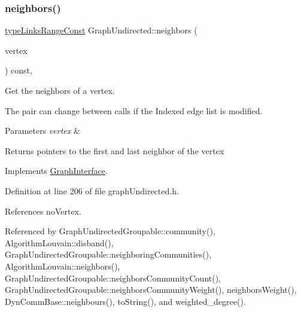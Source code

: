 \mbox{\label{classGraphUndirected_ad9058dbbd7e6d2930a6a233e8b6b0547}} 
\subsubsection{\texorpdfstring{neighbors()}{neighbors()}}
{\footnotesize\ttfamily \hyperlink{graphInterface_8h_ae8d27008f15586bbf419af7ad2e0a48a}{type\+Links\+Range\+Const} Graph\+Undirected\+::neighbors (\begin{DoxyParamCaption}\item[{const \hyperlink{edge_8h_a5fbd20c46956d479cb10afc9855223f6}{type\+Vertex} \&}]{vertex }\end{DoxyParamCaption}) const\hspace{0.3cm}{\ttfamily [inline]}, {\ttfamily [virtual]}}



Get the neighbors of a vertex. 

The pair can change between calls if the Indexed edge list is modified. 
\begin{DoxyParams}{Parameters}
{\em vertex} & \\
\hline
\end{DoxyParams}
\begin{DoxyReturn}{Returns}
pointers to the first and last neighbor of the vertex 
\end{DoxyReturn}


Implements \hyperlink{classGraphInterface_afd5cdff5531b27fca35b58904d757db6}{Graph\+Interface}.



Definition at line 206 of file graph\+Undirected.\+h.



References no\+Vertex.



Referenced by Graph\+Undirected\+Groupable\+::community(), Algorithm\+Louvain\+::disband(), Graph\+Undirected\+Groupable\+::neighboring\+Communities(), Algorithm\+Louvain\+::neighbors(), Graph\+Undirected\+Groupable\+::neighbors\+Community\+Count(), Graph\+Undirected\+Groupable\+::neighbors\+Community\+Weight(), neighbors\+Weight(), Dyn\+Comm\+Base\+::neighbours(), to\+String(), and weighted\+\_\+degree().

\mbox{\label{classGraphUndirected_a90fdfbabe541262292733703d839812a}} 
